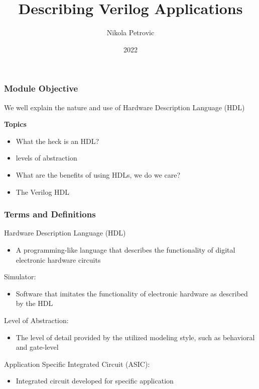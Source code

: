 \documentclass[t]{beamer}
\title{Describing Verilog Applications}
\author{Nikola Petrovic}
\institute{University of Belgrade, School of Electrical Engineering}
\date{2022}
\begin{document}
\frame{\titlepage}

\begin{frame}
\frametitle{Module Objective}

We well explain the nature and use of Hardware Description Language (HDL)
\newline

\textbf{Topics}

\begin{itemize}
\item What the heck is an HDL?
\item levels of abstraction
\item What are the benefits of using HDLs, we do we care?
\item The Verilog HDL
\end{itemize}

\end{frame}


\begin{frame}
\frametitle{Terms and Definitions}

Hardware Description Language (HDL)
\begin{itemize}
\item A programming-like language that describes the functionality of digital electronic hardware circuits
\end{itemize}
Simulator:
\begin{itemize}
\item Software that imitates the functionality of electronic hardware as described by the HDL
\end{itemize}
Level of Abstraction:
\begin{itemize}
\item The level of detail provided by the utilized modeling style, such as behavioral and gate-level
\end{itemize}
Application Specific Integrated Circuit (ASIC):
\begin{itemize}
\item Integrated circuit developed for specific application
\end{itemize}
\end{frame}
\end{document}
